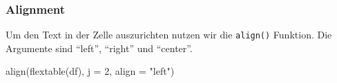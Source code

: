 \documentclass[
]{book}
\newenvironment{Shaded}{\begin{snugshade}}{\end{snugshade}}
\newcommand{\AttributeTok}[1]{\textcolor[rgb]{0.77,0.63,0.00}{#1}}
\newcommand{\DecValTok}[1]{\textcolor[rgb]{0.00,0.00,0.81}{#1}}
\newcommand{\FunctionTok}[1]{\textcolor[rgb]{0.00,0.00,0.00}{#1}}
\newcommand{\NormalTok}[1]{#1}
\newcommand{\StringTok}[1]{\textcolor[rgb]{0.31,0.60,0.02}{#1}}
\begin{document}
\hypertarget{alignment}{%
\subsubsection{Alignment}\label{alignment}}

Um den Text in der Zelle auszurichten nutzen wir die \texttt{align()} Funktion. Die Argumente sind ``left'', ``right'' und ``center''.

\begin{Shaded}
\begin{Highlighting}[]
\FunctionTok{align}\NormalTok{(}\FunctionTok{flextable}\NormalTok{(df), }\AttributeTok{j =} \DecValTok{2}\NormalTok{, }\AttributeTok{align =} \StringTok{"left"}\NormalTok{)}
\end{Highlighting}
\end{Shaded}

\providecommand{\docline}[3]{\noalign{\global\setlength{\arrayrulewidth}{#1}}\arrayrulecolor[HTML]{#2}\cline{#3}}

\setlength{\tabcolsep}{2pt}

\renewcommand*{\arraystretch}{1.5}
\end{document}

